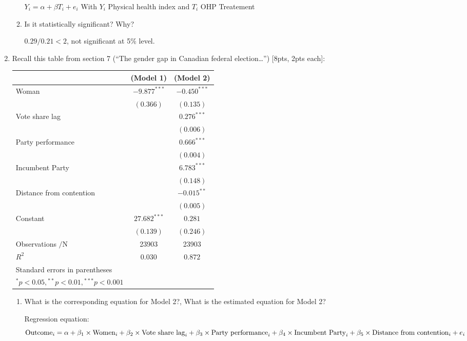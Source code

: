 \documentclass[answers]{exam}
\begin{document}
\begin{enumerate}
\begin{enumerate}
\begin{solution}
    $Y_i = \alpha + \beta T_i + e_i$  With $Y_i$ Physical health index and $T_i$ OHP Treatement
    \end{solution}
     \item Is it statistically significant? Why?
     \begin{solution}
     $0.29/0.21<2$, not significant at 5\% level. 
     \end{solution}
 \end{enumerate}

 





\newpage
\item Recall this table from section 7 (“The gender gap in Canadian federal election…”) [8pts, 2pts each]: 

\centering
\begin{tabular}{lcc}
\hline \hline & (Model 1) & (Model 2) \\
\hline Woman & $-9.877^{* * *}$ & $-0.450^{* * *}$ \\
& $(0.366)$ & $(0.135)$ \\
Vote share lag & & $0.276^{* * *}$ \\
& & $(0.006)$ \\
Party performance & & $0.666^{* * *}$ \\
& & $(0.004)$ \\
Incumbent Party & & $6.783^{* * *}$ \\
& & $(0.148)$ \\
Distance from contention & & $-0.015^{* *}$ \\
& & $(0.005)$ \\
Constant & $27.682^{* * *}$ & $0.281$ \\
& $(0.139)$ & $(0.246)$ \\
\hline Observations $/ \mathrm{N}$ & 23903 & 23903 \\
$R^{2}$ & $0.030$ & $0.872$ \\
\hline \hline Standard errors in parentheses & & \\
${ }^{*} p<0.05,{ }^{* *} p<0.01,{ }^{* * *} p<0.001$ &
\end{tabular}

\raggedright
\begin{enumerate}[label=\alph*)]
    \item What is the corresponding equation for Model 2?, What is the estimated equation for Model 2?
    \begin{solution}
    Regression equation:
    \begin{equation*}
    \text{Outcome}_{i} = \alpha + \beta_{1}\times \text{Women}_{i} +\beta_{2} \times \text{Vote share lag}_{i} +\beta_{3} \times \text{Party performance}_{i} +\\ 
    \beta_{4} \times \text{Incumbent Party}_{i}+\beta_{5} \times \text{Distance from contention}_{i} +e_{i}
    \end{equation*}
    

\end{solution}
\end{enumerate}
\end{enumerate}
\end{document}
